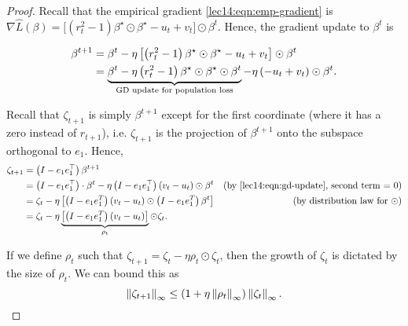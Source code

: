 \begin{proof}
Recall that the empirical gradient \eqref{lec14:eqn:emp-gradient} is $\nabla \hat{L}(\beta) = \big[(r_{t}^{2} - 1) \beta^\star \odot \beta^\star - u_{t} + v_{t} \big] \odot \beta^{t}$. Hence, the gradient update to $\beta^{t}$ is

\begin{align}
\beta^{t+1} &= \beta^{t} - \eta \left[\left(r_{t}^{2} - 1\right) \beta^\star \odot \beta^\star - u_{t} + v_{t} \right] \odot \beta^{t} \\
&= \underbrace{\beta^{t} - \eta \left(r_{t}^{2} - 1\right) \beta^\star  \odot \beta^\star \odot \beta^{t}}_{\text{GD update for population loss}} - \eta \left(- u_{t} + v_{t}\right) \odot \beta^{t}. \label{lec14:eqn:gd-update}
\end{align}
    
Recall that $\zeta_{t+1}$ is simply $\beta^{t+1}$ except for the first coordinate (where it has a zero instead of $r_{t+1}$), i.e. $\zeta_{t+1}$ is the projection of $\beta^{t+1}$ onto the subspace orthogonal to $e_1$. Hence,
\begin{align}
\zeta_{t+1} &= \left(I - e_{1} e_{1}^\top\right) \beta^{t+1} \\
&= \left(I - e_{1} e_{1}^\top\right) \cdot \beta^{t} - \eta \left(I - e_{1} e_{1}^\top\right) (v_{t} - u_{t}) \odot \beta^{t} &\text{(by \eqref{lec14:eqn:gd-update}, second term = 0)} \\
&= \zeta_{t} - \eta \left[\left(I - e_{1}e_{1}^{T}\right) (v_{t} - u_{t}) \odot \left(I - e_{1}e_{1}^{T}\right) \beta^{t}\right] &(\text{by distribution law for $\odot$}) \\
&= \zeta_t - \eta \underbrace{\left[ \left(I - e_{1}e_{1}^{T}\right) \left(v_t - u_t\right)\right]}_{\rho_t} \odot \zeta_t.
\end{align}
    
If we define $\rho_t$ such that $\zeta_{t+1} = \zeta_t - \eta \rho_t \odot \zeta_t$, then the growth of $\zeta_t$ is dictated by the size of $\rho_t$. We can bound this as
\begin{equation}
\left\|\zeta_{t+1}\right\|_{\infty} \leq (1 + \eta \left\|\rho_{t}\right\|_{\infty}) \left\|\zeta_{t}\right\|_{\infty}. \label{lec14:eqn:zeta-growth-bd}
\end{equation}


\end{proof}
